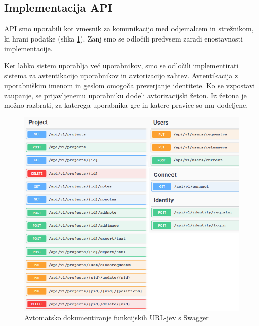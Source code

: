 \documentclass[a4paper, 12pt]{book}
\begin{document}


\subsection{Implementacija API}

API smo uporabili kot vmesnik za komunikacijo med odjemalcem in strežnikom, ki hrani podatke (slika \ref{api_routes}).
Zanj smo se odločili predvsem zaradi enostavnosti implementacije.

Ker lahko sistem uporablja več uporabnikov, smo se odločili implementirati sistema za avtentikacijo uporabnikov in avtorizacijo zahtev.
Avtentikacija z uporabniškim imenom in geslom omogoča preverjanje identitete.
Ko se vzpostavi zaupanje, se prijavljenemu uporabniku dodeli avtorizacijski žeton.
Iz žetona je možno razbrati, za katerega uporabnika gre in katere pravice so mu dodeljene.


\begin{figure}[H]
\begin{center}
\includegraphics[width=13.5cm]{api_routes_small}
\end{center}
\caption{Avtomatsko dokumentiranje funkcijskih URL-jev s Swagger}
\label{api_routes}
\end{figure}
\end{document}
